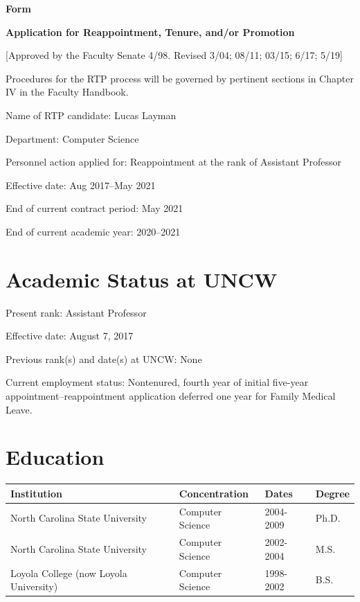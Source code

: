 \documentclass[10pt]{article}
\newcommand\D{\hangindent1.25cm}
\begin{document}
\begin{center}
    
\textbf{{\large Form}}

\textbf{{\large Application for Reappointment, Tenure, and/or Promotion}}

{\footnotesize [Approved by the Faculty Senate 4/98. Revised 3/04; 08/11; 03/15; 6/17; 5/19]}
\end{center}

Procedures for the RTP  process will be governed by pertinent sections in Chapter IV in the Faculty Handbook.  

Name of RTP candidate: Lucas Layman

Department: Computer Science

Personnel action applied for: Reappointment at the rank of Assistant Professor

\setlength{\parskip}{0cm}
Effective date:	Aug 2017--May 2021

End of current contract period: May 2021

End of current academic year: 2020--2021

\section{Academic Status at UNCW}
\setlength{\parindent}{1.25cm}
\setlength{\parskip}{0cm}

Present rank: Assistant Professor

Effective date: August 7, 2017

Previous rank(s) and date(s) at UNCW: None

\D Current employment status: Nontenured, fourth year of initial five-year appointment--reappointment application deferred one year for Family Medical Leave.

\section{Education}

\begin{table}[!h]
\centering
\begin{tabular}{@{}llll@{}}
\toprule
Institution                       & Concentration      & Dates     & Degree \\ \midrule
North   Carolina State University & Computer   Science & 2004-2009 & Ph.D.  \\
North   Carolina State University & Computer   Science & 2002-2004 & M.S.   \\
Loyola   College (now Loyola University)                  & Computer   Science & 1998-2002 & B.S.   \\ \bottomrule
\end{tabular}
\end{table}
\end{document}
